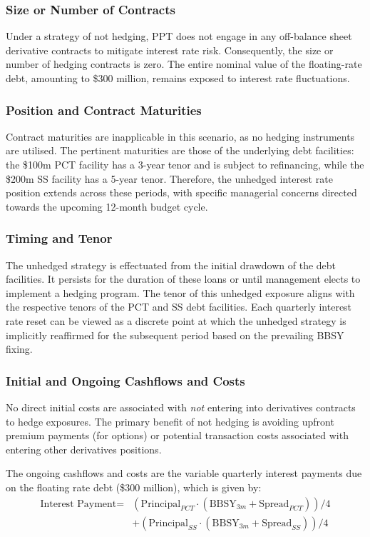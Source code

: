 \documentclass[11pt, a4paper, british]{article}
\begin{document}
\subsubsection{Size or Number of Contracts}
Under a strategy of not hedging, PPT does not engage in any off-balance sheet derivative contracts to mitigate interest rate risk. Consequently, the size or number of hedging contracts is zero. The entire nominal value of the floating-rate debt, amounting to \$300 million, remains exposed to interest rate fluctuations.

\subsubsection{Position and Contract Maturities}
Contract maturities are inapplicable in this scenario, as no hedging instruments are utilised. The pertinent maturities are those of the underlying debt facilities: the \$100m PCT facility has a 3-year tenor and is subject to refinancing, while the \$200m SS facility has a 5-year tenor. Therefore, the unhedged interest rate position extends across these periods, with specific managerial concerns directed towards the upcoming 12-month budget cycle.
\subsubsection{Timing and Tenor}
The unhedged strategy is effectuated from the initial drawdown of the debt facilities. It persists for the duration of these loans or until management elects to implement a hedging program. The tenor of this unhedged exposure aligns with the respective tenors of the PCT and SS debt facilities. Each quarterly interest rate reset can be viewed as a discrete point at which the unhedged strategy is implicitly reaffirmed for the subsequent period based on the prevailing BBSY fixing.
\subsubsection{Initial and Ongoing Cashflows and Costs}
No direct initial costs are associated with \emph{not} entering into derivatives contracts to hedge exposures. The primary benefit of not hedging is avoiding upfront premium payments (for options) or potential transaction costs associated with entering other derivatives positions.  

The ongoing cashflows and costs are the variable quarterly interest payments due on the floating rate debt (\$300 million), which is given by:
\begin{equation}
\begin{split}
    \text{Interest Payment} ={}& \left(\text{Principal}_{PCT} \cdot (\text{BBSY}_{3m} + \text{Spread}_{PCT}) \right) /4 \\
    & + \left(\text{Principal}_{SS} \cdot (\text{BBSY}_{3m} + \text{Spread}_{SS}) \right) /4
\end{split}
\end{equation}
\end{document}
